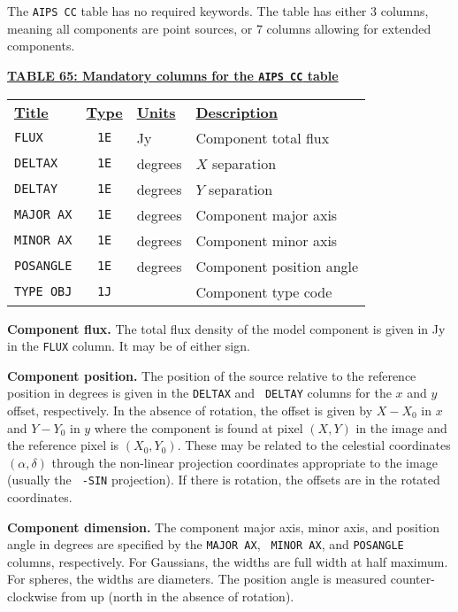 \documentclass[twoside]{article}
\newcommand{\Hi}[1]{\textcolor{hicol}{#1}}
\begin{document}
The {\tt AIPS CC} table has no required keywords.  The table has
either 3 columns, meaning all components are point sources, or 7
columns allowing for extended components.

\begin{center}
\underline{\bf{TABLE 65: Mandatory columns for the {\tt AIPS CC} table}}\\
\begin{tabular}{lcll}
\noalign{\vspace{2pt}} \label{ta:CCcols}
\underline{{\bf Title\vphantom{y}}} & \underline{\bf{Type}} &
   \underline{{\bf Units\vphantom{y}}} & \underline{\bf{Description}} \\
\noalign{\vspace{2pt}}
{\tt FLUX}     & {\tt 1E} & Jy      & Component total flux \\
{\tt DELTAX}   & {\tt 1E} & degrees & $X$ separation \\
{\tt DELTAY}   & {\tt 1E} & degrees & $Y$ separation \\
\hline
{\tt MAJOR AX} & {\tt 1E} & degrees & Component major axis \\
{\tt MINOR AX} & {\tt 1E} & degrees & Component minor axis \\
{\tt POSANGLE} & {\tt 1E} & degrees & Component position angle \\
{\tt TYPE OBJ} & {\tt 1J} &         & Component type code
\end{tabular}
\end{center}

{\bf Component flux.}  The total flux density of the model component
is given in Jy in the {\tt FLUX} column.  It may be of either sign.

{\bf Component position.} The position of the source relative to the
reference position in degrees is given in the {\tt DELTAX} and {\tt
  DELTAY} columns for the $x$ and $y$ offset, respectively.  In the
absence of rotation, the offset is given by \Hi{$X - X_0$ in $x$ and
$Y-Y_0$ in $y$ where the component is found at pixel $(X,Y)$ in the
image and the reference pixel is $(X_0,Y_0)$\@.  These may be related
to the celestial coordinates $(\alpha,\delta)$ through the non-linear
projection coordinates appropriate to the image (usually the {\tt
-SIN} projection).}  If there is rotation, the offsets are in the
rotated coordinates.

{\bf Component dimension.} The component major axis, minor axis, and
position angle in degrees are specified by the {\tt MAJOR AX}, {\tt
  MINOR AX}, and {\tt POSANGLE} columns, respectively.  For Gaussians,
the widths are full width at half maximum.  For spheres, the widths
are diameters.  The position angle is measured counter-clockwise from
up (north in the absence of rotation).
\end{document}
